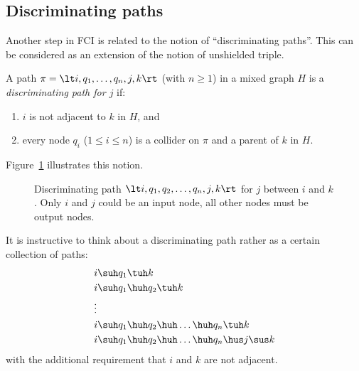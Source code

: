 \subsection{Discriminating paths}

Another step in FCI is related to the notion of ``discriminating paths''.
This can be considered as an extension of the notion of unshielded triple.
\begin{Def}\label{def:discriminating_path}
  A path $\pi = \lt i, q_1, \dots, q_n, j, k\rt$ (with $n \ge 1$) in a mixed graph $H$ is a \emph{discriminating path for $j$} if:
  \begin{enumerate}[label=(\roman*)]
    \item $i$ is not adjacent to $k$ in $H$, and
    \item every node $q_i$ ($1 \le i \le n$) is a collider on $\pi$ and a parent of $k$ in $H$.
  \end{enumerate}
\end{Def}
Figure~\ref{fig:discriminating_path} illustrates this notion.

\begin{figure}\centering
  \caption{Discriminating path $\lt i,q_1,q_2,\dots,q_n,j,k \rt$ for $j$ between $i$ and $k$.
  Only $i$ and $j$ could be an input node, all other nodes must be output nodes.\label{fig:discriminating_path}}
\end{figure}

\begin{Rem}\label{rem:discriminating_path}
  It is instructive to think about a discriminating path rather as a certain collection of paths:
  \begin{align*}
    &i \suh q_1 \tuh k \\
    &i \suh q_1 \huh q_2 \tuh k \\
    &\vdots \\
    &i \suh q_1 \huh q_2 \huh \dots \huh q_n \tuh k \\
    &i \suh q_1 \huh q_2 \huh \dots \huh q_n \hus j \sus k
  \end{align*}
  with the additional requirement that $i$ and $k$ are not adjacent.
\end{Rem}


